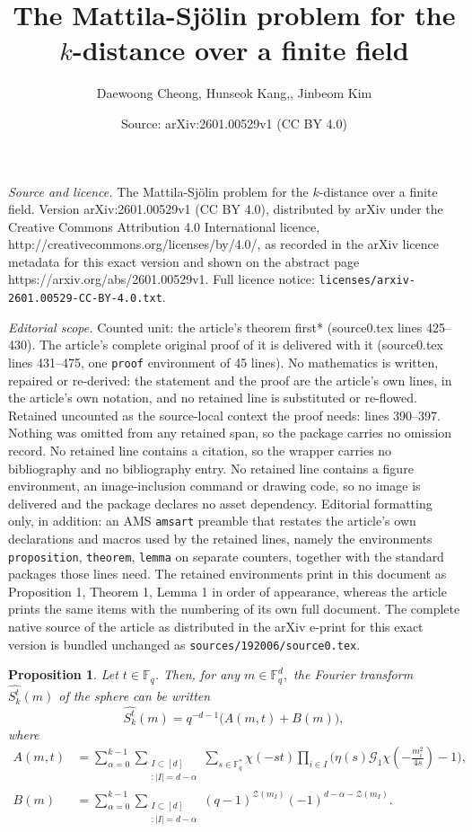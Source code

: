\documentclass[10pt,a4paper]{amsart}
\title{The Mattila-Sj\"{o}lin problem for the $k$-distance over a finite field}
\author{Daewoong Cheong, Hunseok Kang,, Jinbeom Kim}
\date{Source: arXiv:2601.00529v1 (CC BY 4.0)}
\newtheorem{proposition}{Proposition}
\def\Fq#1{\mathbb{F}_q^{#1}}
\begin{document}
\maketitle

\noindent\emph{Source and licence.} The Mattila-Sj\"{o}lin problem for the $k$-distance over a finite field. Version arXiv:2601.00529v1 (CC BY 4.0), distributed by arXiv under the Creative Commons Attribution 4.0 International licence, http://creativecommons.org/licenses/by/4.0/, as recorded in the arXiv licence metadata for this exact version and shown on the abstract page https://arxiv.org/abs/2601.00529v1. Full licence notice: \texttt{licenses/arxiv-2601.00529-CC-BY-4.0.txt}.\par\smallskip

\noindent\textit{Editorial scope.} Counted unit: the article's theorem first* (source0.tex lines 425--430). The article's complete original proof of it is delivered with it (source0.tex lines 431--475, one \texttt{proof} environment of 45 lines). No mathematics is written, repaired or re-derived: the statement and the proof are the article's own lines, in the article's own notation, and no retained line is substituted or re-flowed.  Retained uncounted as the source-local context the proof needs: lines 390--397.  Nothing was omitted from any retained span, so the package carries no omission record.  No retained line contains a citation, so the wrapper carries no bibliography and no bibliography entry.  No retained line contains a figure environment, an image-inclusion command or drawing code, so no image is delivered and the package declares no asset dependency.  Editorial formatting only, in addition: an AMS \texttt{amsart} preamble that restates the article's own declarations and macros used by the retained lines, namely the environments \texttt{proposition}, \texttt{theorem}, \texttt{lemma} on separate counters, together with the standard packages those lines need.  The retained environments print in this document as Proposition 1, Theorem 1, Lemma 1 in order of appearance, whereas the article prints the same items with the numbering of its own full document.  The complete native source of the article as distributed in the arXiv e-print for this exact version is bundled unchanged as \texttt{sources/192006/source0.tex}.
\begin{proposition}\label{FSF} Let $t\in \mathbb F_q$. Then, for any $m\in \mathbb F_q^d,$ the Fourier transform $\widehat{S_{k}^t} (m)$ of the sphere can be written
$$\widehat{S_{k}^t} (m)=q^{-d-1} \bigg(A(m,t)+B(m)\bigg),$$
where 
\begin{align*}
    A(m,t) &=\sum_{\alpha = 0}^{k-1}\sum_{\substack{{I \subset [d]}\\{:|I| = d-\alpha}}}\sum_{s\in\Fq{*}}\chi(-st)\prod_{i \in I}\bigg(\eta(s)\mathcal{G}_1\chi\left(-\frac{{m}_i^2}{4s}\right)-1\bigg), \\
    B(m) &= \sum_{\alpha = 0}^{k-1}\sum_{\substack{{I \subset [d]}\\{:|I| = d-\alpha}}}(q-1)^{\mathcal{Z}(m_{I})}(-1)^{d-\alpha-\mathcal{Z}(m_I)}.
\end{align*}
\end{proposition}
\end{document}
